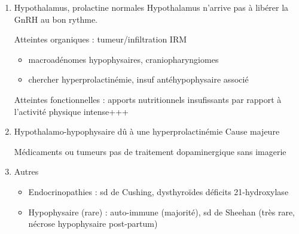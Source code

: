 \documentclass[11pt]{article}
\begin{document}
\begin{enumerate}
\item Hypothalamus, prolactine normales
\label{sec:org09eba66}
Hypothalamus n'arrive pas à libérer la GnRH au bon rythme. 

Atteintes organiques : tumeur/infiltration \thus IRM
\begin{itemize}
\item macroadénomes hypophysaires, craniopharyngiomes
\item chercher hyperprolactinémie, insuf antéhypophysaire associé
\end{itemize}

Atteintes fonctionnelles : apports nutritionnels insufissants par rapport à l'activité physique intense+++
\item Hypothalamo-hypophysaire dû à une hyperprolactinémie
\label{sec:org49992ff}
Cause majeure

Médicaments ou tumeurs \thus pas de traitement dopaminergique sans imagerie \danger
\item Autres
\label{sec:orgd8b1b41}
\begin{itemize}
\item Endocrinopathies : sd de Cushing, dysthyroïdes déficits 21-hydroxylase
\item Hypophysaire (rare) : auto-immune (majorité), sd de Sheehan (très rare, nécrose hypophysaire post-partum)
\end{itemize}
\end{enumerate}
\end{document}
